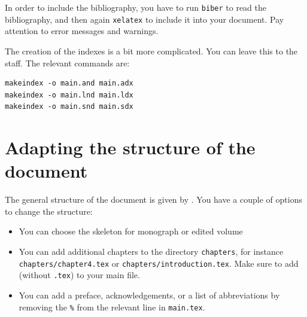 In order to include the bibliography, you have to run \verb+biber+ to read the bibliography, and then again \verb+xelatex+ to include it into your document. Pay attention to error messages and warnings.


The creation of the indexes is a bit more complicated. You can leave this to the \lsp staff. The relevant commands are:

\begin{verbatim}
makeindex -o main.and main.adx
makeindex -o main.lnd main.ldx
makeindex -o main.snd main.sdx
\end{verbatim}


\section{Adapting the structure of the document}
The general structure of the document is given by \lsp. You have a couple of options to change the structure:
\begin{itemize}
 \item You can choose the skeleton for monograph or edited volume
 \item You can add additional chapters to the directory \verb+chapters+, for instance\\ \verb+chapters/chapter4.tex+ or \verb+chapters/introduction.tex+. Make sure to add \verb++ (without \verb+.tex+) to your main file.
 \item You can add a preface, acknowledgements, or a list of abbreviations by removing the \verb+%+ from the relevant line in \verb+main.tex+.
 \end{itemize}




